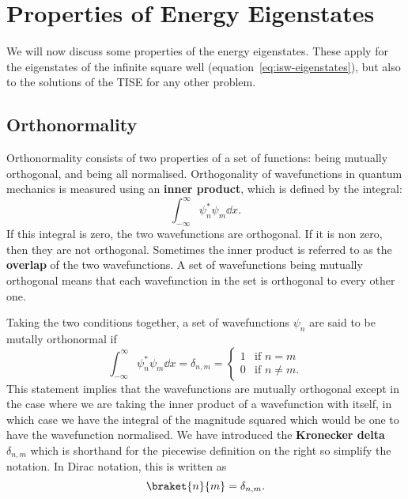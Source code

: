 \documentclass[../quantum_mechanics.tex]{subfiles}
\begin{document}
    \section{Properties of Energy Eigenstates}\label{sec:properties-of-energy-eigenstates}
        We will now discuss some properties of the energy eigenstates.
        These apply for the eigenstates of the infinite square well (equation~\ref{eq:isw-eigenstates}), but also to the solutions of the TISE for any other problem.

        \subsection{Orthonormality}\label{sec:properties-of-energy-eigenstates:subsec:orthonormality}
            Orthonormality consists of two properties of a set of functions: being mutually orthogonal, and being all normalised.
            Orthogonality of wavefunctions in quantum mechanics is measured using an \textbf{inner product}, which is defined by the integral:
            \begin{equation}
                \int_{-\infty}^\infty\psi_n^\ast\psi_m\dd{x}.
            \end{equation}
            If this integral is zero, the two wavefunctions are orthogonal.
            If it is non zero, then they are not orthogonal.
            Sometimes the inner product is referred to as the \textbf{overlap} of the two wavefunctions.
            A set of wavefunctions being mutually orthogonal means that each wavefunction in the set is orthogonal to every other one.

            Taking the two conditions together, a set of wavefunctions $\psi_n$ are said to be mutally orthonormal if
            \begin{equation}
                \int_{-\infty}^\infty\psi_n^\ast\psi_m\dd{x}=\delta_{n,m}=\begin{cases}
                    1 & \text{if } n=m\\
                    0 & \text{if } n\neq m.
                \end{cases}
            \end{equation}
            This statement implies that the wavefunctions are mutually orthogonal except in the case where we are taking the inner product of a wavefunction with itself, in which case we have the integral of the magnitude squared which would be one to have the wavefunction normalised.
            We have introduced the \textbf{Kronecker delta} $\delta_{n,m}$ which is shorthand for the piecewise definition on the right so simplify the notation.
            In Dirac notation, this is written as
            \begin{equation}
                \braket{n}{m}=\delta_{n,m}.
            \end{equation}
\end{document}
